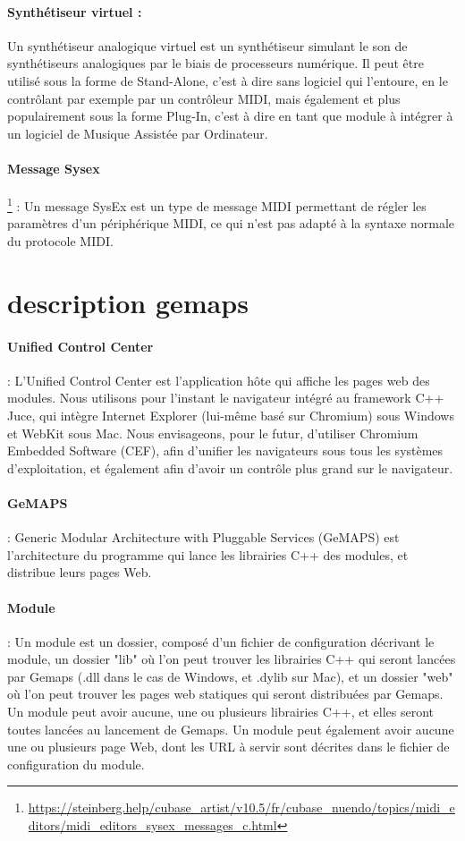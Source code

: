 \documentclass[francais]{rapportPFE}  %
\begin{document}
\paragraph{Synthétiseur virtuel :} Un synthétiseur analogique virtuel est un synthétiseur simulant le son de synthétiseurs analogiques par le biais de processeurs numérique. Il peut être utilisé sous la forme de Stand-Alone, c'est à dire sans logiciel qui l'entoure, en le contrôlant par exemple par un contrôleur MIDI, mais également et plus populairement sous la forme Plug-In, c'est à dire en tant que module à intégrer à un logiciel de Musique Assistée par Ordinateur.
\paragraph{Message Sysex}
\footnote{\url{https://steinberg.help/cubase_artist/v10.5/fr/cubase_nuendo/topics/midi_editors/midi_editors_sysex_messages_c.html}}
: Un message SysEx est un type de message MIDI permettant de régler les paramètres d'un périphérique MIDI, ce qui n'est pas adapté à la syntaxe normale du protocole MIDI.




\section{description gemaps}
\paragraph{Unified Control Center} : L'Unified Control Center est l'application hôte qui affiche les pages web des modules. Nous utilisons pour l'instant le navigateur intégré au framework C++ Juce, qui intègre Internet Explorer (lui-même basé sur Chromium) sous Windows et WebKit sous Mac. Nous envisageons, pour le futur, d'utiliser Chromium Embedded Software (CEF), afin d'unifier les navigateurs sous tous les systèmes d'exploitation, et également afin d'avoir un contrôle plus grand sur le navigateur.
\paragraph{GeMAPS} : Generic Modular Architecture with Pluggable Services (GeMAPS) est l'architecture du programme qui lance les librairies C++ des modules, et distribue leurs pages Web. 
\paragraph{Module} : Un module est un dossier, composé d'un fichier de configuration décrivant le module, un dossier "lib" où l'on peut trouver les librairies C++ qui seront lancées par Gemaps (.dll dans le cas de Windows, et .dylib sur Mac), et un dossier "web" où l'on peut trouver les pages web statiques qui seront distribuées par Gemaps. Un module peut avoir aucune, une ou plusieurs librairies C++, et elles seront toutes lancées au lancement de Gemaps. Un module peut également avoir aucune une ou plusieurs page Web, dont les URL à servir sont décrites dans le fichier de configuration du module.
\end{document}
